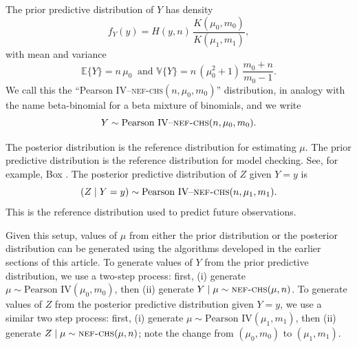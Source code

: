 \documentclass[12pt,reqno,tbtags]{amsart}
\newcommand{\EXP}{\mathbb{E}}
\newcommand{\Var}{\mathbb{V}}
\begin{document}
The prior predictive distribution of $Y$ has density
$$
f_Y(y) = H(y, n)\, \frac{K(\mu_0, m_0)}{K(\mu_1, m_1)},
$$
with mean and variance
$$
\EXP\{Y\} = n\, \mu_0 \ \text{ and }
\Var\{Y\} = n\, (\mu_0^2 + 1)\, \frac{m_0 + n}{m_0 - 1}.
$$
We call this the ``Pearson IV--\textsc{nef-chs}$(n, \mu_0, m_0)$'' distribution, in analogy with the name beta-binomial for a beta mixture of binomials, and we write
$$
Y \sim \text{Pearson IV--}\textsc{nef-chs}(n, \mu_0, m_0).
$$

The posterior distribution is the reference distribution for estimating $\mu$. The prior predictive distribution is the reference distribution for model checking. See, for example, Box \cite{box1980sampling, box1983apology}. The posterior predictive distribution of $Z$ given $Y = y$ is
$$
(Z \mid Y = y) \sim \text{Pearson IV--}\textsc{nef-chs}(n, \mu_1, m_1).
$$
This is the reference distribution used to predict future observations.

Given this setup, values of $\mu$ from either the prior distribution or the posterior distribution can be generated using the algorithms developed in the earlier sections of this article. To generate values of $Y$ from the prior predictive distribution, we use a two-step process: first, (i) generate $\mu \sim \text{Pearson IV}(\mu_0, m_0)$, then (ii) generate $Y \mid \mu \sim \textsc{nef-chs}(\mu, n)$. To generate values of $Z$ from the posterior predictive distribution given $Y = y$, we use a similar two step process: first, (i) generate $\mu \sim \text{Pearson IV}(\mu_1, m_1)$, then (ii) generate $Z \mid \mu \sim \textsc{nef-chs}(\mu, n)$; note the change from $(\mu_0, m_0)$ to $(\mu_1, m_1)$.




\end{document}

